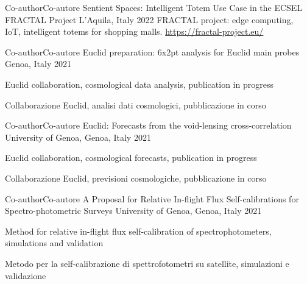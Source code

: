


\begin{cventries}


\cventry
{
    \ifenglish Co-author\else Co-autore\fi
}
{
    Sentient Spaces: Intelligent Totem Use Case in the ECSEL FRACTAL Project
}
{L'Aquila, Italy}
{2022}
{
    FRACTAL project: edge computing, IoT, intelligent totems for shopping malls. \url{https://fractal-project.eu/}
}


\cventry
{\ifenglish Co-author\else Co-autore\fi} %
{Euclid preparation: 6x2pt analysis for Euclid main probes} %
{Genoa, Italy}
{2021} %
{ %
\begin{cvitems}
  \ifenglish
  \item {Euclid collaboration, cosmological data analysis, publication in progress}
  \else
  \item {Collaborazione Euclid, analisi dati cosmologici, pubblicazione in corso}
  \fi
\end{cvitems}
}


\cventry
{\ifenglish Co-author\else Co-autore\fi} %
{Euclid: Forecasts from the void-lensing cross-correlation} %
{University of Genoa, Genoa, Italy}
{2021} %
{ %
\begin{cvitems}
  \ifenglish
  \item {Euclid collaboration, cosmological forecasts, publication in progress}
  \else
  \item {Collaborazione Euclid, previsioni cosmologiche, pubblicazione in corso}
  \fi
\end{cvitems}
}
\cventry
{\ifenglish Co-author\else Co-autore\fi} %
{A Proposal for Relative In-flight Flux Self-calibrations for Spectro-photometric Surveys} %
{University of Genoa, Genoa, Italy}
{2021} %
{
\begin{cvitems}
  \ifenglish
  \item {Method for relative in-flight flux self-calibration of spectrophotometers, simulations and validation}
  \else
  \item {Metodo per la self-calibrazione di spettrofotometri su satellite, simulazioni e validazione}
  \fi
\end{cvitems}
}

\end{cventries}